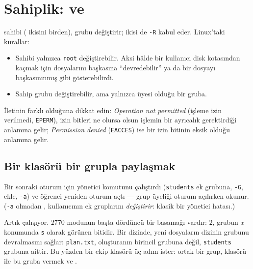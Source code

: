 \section{Sahiplik:  ve }
\label{sec:own}

 sahibi ( ikisini birden),  grubu değiştirir; ikisi de \texttt{-R} kabul eder. Linux'taki kurallar:
\begin{itemize}
  \item Sahibi yalnızca \texttt{root} değiştirebilir. Aksi hâlde bir kullanıcı disk kotasından kaçmak için dosyalarını başkasına ``devredebilir'' ya da bir dosyayı başkasınınmış gibi gösterebilirdi.
  \item Sahip grubu değiştirebilir, ama yalnızca üyesi olduğu bir gruba.
\end{itemize}



İletinin farklı olduğuna dikkat edin: \emph{Operation not permitted} (işleme izin verilmedi, \texttt{EPERM}), izin bitleri ne olursa olsun işlemin bir ayrıcalık gerektirdiği anlamına gelir; \emph{Permission denied} (\texttt{EACCES}) ise bir izin bitinin eksik olduğu anlamına gelir.

\subsection{Bir klasörü bir grupla paylaşmak}

Bir sonraki oturum için yönetici  komutunu çalıştırdı (\texttt{students} ek grubuna, \texttt{-G}, ekle, \texttt{-a}) ve öğrenci yeniden oturum açtı --- grup üyeliği oturum açılırken okunur. (\texttt{-a} olmadan , kullanıcının ek gruplarını \emph{değiştirir}: klasik bir yönetici hatası.)



Artık  çalışıyor. $2770$ modunun başta dördüncü bir basamağı vardır: $2$, grubun $x$ konumunda \texttt{s} olarak görünen  bitidir. Bir dizinde, yeni dosyaların dizinin grubunu devralmasını sağlar: \texttt{plan.txt}, oluşturanın birincil grubuna değil, \texttt{students} grubuna aittir. Bu yüzden bir ekip klasörü üç adım ister: ortak bir grup, klasörü  ile bu gruba vermek ve .

